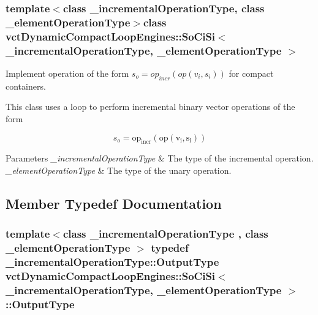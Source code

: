 \subsubsection*{template$<$class \-\_\-incremental\-Operation\-Type, class \-\_\-element\-Operation\-Type$>$class vct\-Dynamic\-Compact\-Loop\-Engines\-::\-So\-Ci\-Si$<$ \-\_\-incremental\-Operation\-Type, \-\_\-element\-Operation\-Type $>$}

Implement operation of the form $s_o = op_{incr}(op(v_i, s_i))$ for compact containers. 

This class uses a loop to perform incremental binary vector operations of the form

\[ s_o = \mathrm{op_{incr}(\mathrm{op}(v_i, s_i))} \]


\begin{DoxyParams}{Parameters}
{\em \-\_\-incremental\-Operation\-Type} & The type of the incremental operation.\\
\hline
{\em \-\_\-element\-Operation\-Type} & The type of the unary operation. \\
\hline
\end{DoxyParams}


\subsection{Member Typedef Documentation}
\hypertarget{classvct_dynamic_compact_loop_engines_1_1_so_ci_si_a2a36b75e6bf3d9b8dd1db23d5e5f8453}{
\subsubsection[{Output\-Type}]{\setlength{\rightskip}{0pt plus 5cm}template$<$class \-\_\-incremental\-Operation\-Type , class \-\_\-element\-Operation\-Type $>$ typedef \-\_\-incremental\-Operation\-Type\-::\-Output\-Type {\bf vct\-Dynamic\-Compact\-Loop\-Engines\-::\-So\-Ci\-Si}$<$ \-\_\-incremental\-Operation\-Type, \-\_\-element\-Operation\-Type $>$\-::{\bf Output\-Type}}}\label{classvct_dynamic_compact_loop_engines_1_1_so_ci_si_a2a36b75e6bf3d9b8dd1db23d5e5f8453}


